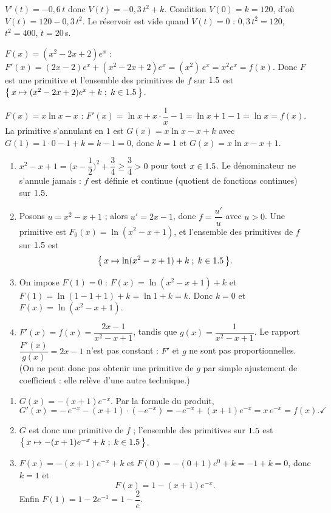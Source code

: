 $V'(t)=-0{,}6\,t$ donc $V(t)=-0{,}3\,t^{2}+k$. Condition $V(0)=k=120$, d'où
$V(t)=120-0{,}3\,t^{2}$. Le réservoir est vide quand $V(t)=0$ :
$0{,}3\,t^{2}=120$, $t^{2}=400$, $t=20$\,s.

$F(x)=(x^{2}-2x+2)e^{x}$ : $F'(x)=(2x-2)e^{x}+(x^{2}-2x+2)e^{x}=(x^{2})\,e^{x}=x^{2}e^{x}=f(x)$. \checkmark
Donc $F$ est une primitive et l'ensemble des primitives de $f$ sur $1.5$ est
$\big\{\,x\mapsto(x^{2}-2x+2)e^{x}+k\;;\;k\in1.5\,\big\}$.

$F(x)=x\ln x-x$ : $F'(x)=\ln x+x\cdot\dfrac1x-1=\ln x+1-1=\ln x=f(x)$. \checkmark
La primitive s'annulant en $1$ est $G(x)=x\ln x-x+k$ avec $G(1)=1\cdot0-1+k=k-1=0$,
donc $k=1$ et $G(x)=x\ln x-x+1$.

\begin{enumerate}[label=\arabic*)]
\item $x^{2}-x+1=\Big(x-\dfrac12\Big)^{2}+\dfrac34\ge\dfrac34>0$ pour tout $x\in1.5$.
Le dénominateur ne s'annule jamais : $f$ est définie et continue (quotient de fonctions
continues) sur $1.5$.
\item Posons $u=x^{2}-x+1$ ; alors $u'=2x-1$, donc $f=\dfrac{u'}{u}$ avec $u>0$.
Une primitive est $F_0(x)=\ln(x^{2}-x+1)$, et l'ensemble des primitives de $f$ sur $1.5$ est
\[
\big\{\,x\mapsto\ln(x^{2}-x+1)+k\;;\;k\in1.5\,\big\}.
\]
\item On impose $F(1)=0$ : $F(x)=\ln(x^{2}-x+1)+k$ et $F(1)=\ln(1-1+1)+k=\ln1+k=k$.
Donc $k=0$ et $F(x)=\ln(x^{2}-x+1)$.
\item $F'(x)=f(x)=\dfrac{2x-1}{x^{2}-x+1}$, tandis que $g(x)=\dfrac1{x^{2}-x+1}$.
Le rapport $\dfrac{F'(x)}{g(x)}=2x-1$ n'est pas constant : $F'$ et $g$ ne sont pas
proportionnelles. (On ne peut donc pas obtenir une primitive de $g$ par simple
ajustement de coefficient : elle relève d'une autre technique.)
\end{enumerate}

\begin{enumerate}[label=\arabic*)]
\item $G(x)=-(x+1)e^{-x}$. Par la formule du produit,
\[
G'(x)=-\,e^{-x}-(x+1)\cdot(-e^{-x})=-e^{-x}+(x+1)e^{-x}=x\,e^{-x}=f(x). \checkmark
\]
\item $G$ est donc une primitive de $f$ ; l'ensemble des primitives sur $1.5$ est
$\big\{\,x\mapsto-(x+1)e^{-x}+k\;;\;k\in1.5\,\big\}$.
\item $F(x)=-(x+1)e^{-x}+k$ et $F(0)=-(0+1)e^{0}+k=-1+k=0$, donc $k=1$ et
\[
F(x)=1-(x+1)e^{-x}.
\]
Enfin $F(1)=1-2e^{-1}=1-\dfrac2e$.
\end{enumerate}

